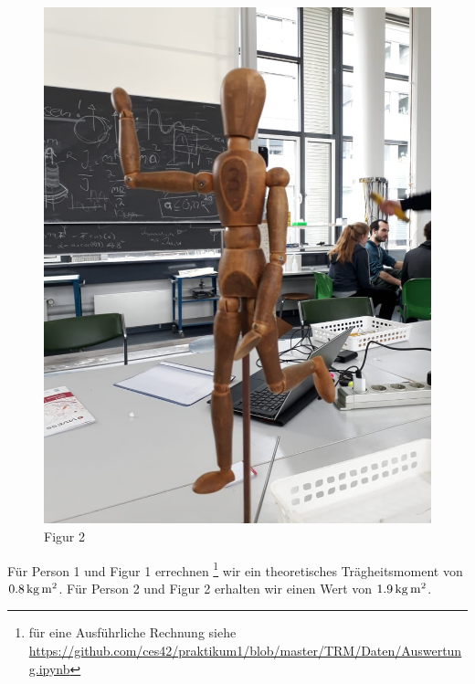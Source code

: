 \begin{figure}
\begin{minipage}{.49\textwidth}
    \includegraphics[scale=.28]{./Bilder/figur2.jpeg}
    \caption{Figur 2}
    \label{fig:2}
\end{minipage}
\end{figure}

Für Person 1 und Figur 1 errechnen%
\footnote{für eine Ausführliche Rechnung siehe \url{https://github.com/ces42/praktikum1/blob/master/TRM/Daten/Auswertung.ipynb}}
wir ein theoretisches Trägheitsmoment von  $\unit[0.8]{kg\,m^2}$. Für Person 2 und Figur 2 erhalten wir einen Wert von $\unit[1.9]{kg\,m^2}$. 


